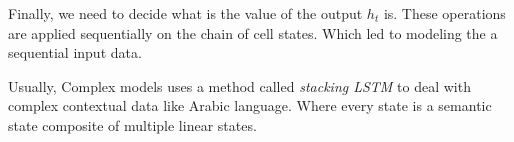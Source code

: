 \vspace{0.5cm}
Finally, we need to decide what is the value of the output $h_t$ is.
These operations are applied sequentially on the chain of cell states. Which led to modeling the a sequential input data.

Usually, Complex models uses a method called \textit{stacking LSTM} to deal with complex contextual data like Arabic language. Where every state is a semantic state composite of multiple linear states.
